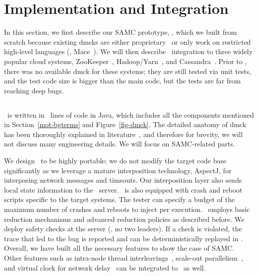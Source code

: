 \section{Implementation and Integration}
\label{sec-samc-impl}

In this section, we first describe our SAMC prototype, \sampro, which we
built from scratch because existing dmcks are either
proprietary~\cite{Yang+09-Modist} or only work on restricted high-level
languages (\eg, Mace~\cite{Killian+07-LifeDeathMaceMC}).  We will then describe
\sampro\ integration to three widely popular cloud systems,
ZooKeeper~\cite{Hunt+10-ZooKeeperPaper}, Hadoop/Yarn~\cite{Kumar+13-Yarn},
and Cassandra~\cite{Lakshman+09-Cassandra}.  Prior to \sampro, there was no
available dmck for these systems; they are still tested via unit tests, and
the test code size is bigger than the main code, but the tests are far from
reaching deep bugs.


\subsection{\sampro}
\label{imp-pro}

\sampro\ is written in \numLinesSamPro\ lines of code in Java, which
includes all the components mentioned in Section~\ref{mot-bgterms} and
Figure~\ref{fig-dmck}.  The detailed anatomy of dmck has been
thoroughly explained in literature~\cite{Guerraoui+11-McNoNetwork,
  Guo+11-Demeter, Killian+07-LifeDeathMaceMC, Simsa+10-Dbug,
  Yang+09-Modist}, and therefore for brevity, we will not discuss many
engineering details.  We will focus on SAMC-related parts.

We design \sampro\ to be highly portable; we do not modify the target code
base significantly as we leverage a mature interposition technology,
AspectJ, for interposing network messages and timeouts.
Our interposition layer also sends local state information to the
\sampro\ server.
\sampro\ is also equipped with crash and reboot scripts specific to the
target systems.  The tester can specify a budget of the maximum number of
crashes and reboots to inject per execution.
\sampro\ employs basic reduction mechanisms and advanced reduction policies
as described before.
We deploy safety checks at the server (\eg, no two leaders).  If a
check is violated, the trace that led to the bug is reported and 
can be deterministically replayed in \sampro.
Overall, we have built all the necessary features to show the case of
SAMC.  Other features such as intra-node thread
interleavings~\cite{Guo+11-Demeter}, scale-out
parallelism~\cite{Simsa+12-ScalablePOR}, and virtual clock for network
delay~\cite{Yang+09-Modist} can be integrated to \sampro\ as well.


